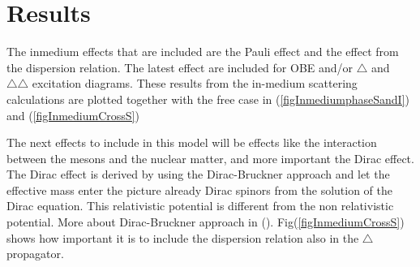 \section{Results}
The inmedium effects that are included are the Pauli effect and the effect from the dispersion relation.
The latest effect are included for OBE and/or  $\triangle$ and $\triangle\triangle$ excitation diagrams.
These results from the in-medium scattering calculations are plotted together with the free
case in (\ref{figInmediumphaseSandI}) and 
(\ref{figInmediumCrossS})

The next effects to include in this model will be effects like the interaction between the mesons and
the nuclear matter, and more important the Dirac effect. The Dirac effect is derived by using the Dirac-Bruckner
approach and let the effective mass enter the picture already Dirac spinors from the solution of the Dirac equation.
This relativistic potential is different from the non relativistic potential. More about Dirac-Bruckner approach
in (\cite{In-med-DiracBruck}).
\nl
Fig(\ref{figInmediumCrossS}) shows how important it is to include the dispersion relation also in the
$\triangle$ propagator.



